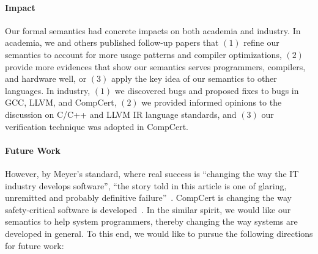 \paragraph{Impact}

Our formal semantics had concrete impacts on both academia and industry.  In academia, we and others
published follow-up papers that $(1)$ refine our semantics to account for more usage patterns and
compiler optimizations, $(2)$ provide more evidences that show our semantics serves programmers,
compilers, and hardware well, or $(3)$ apply the key idea of our semantics to other languages.  In
industry, $(1)$ we discovered bugs and proposed fixes to bugs in GCC, LLVM, and CompCert, $(2)$ we
provided informed opinions to the discussion on C/C++ and LLVM IR language standards, and $(3)$ our
verification technique was adopted in CompCert.



\paragraph{Future Work}

However, by Meyer's standard, where real success is ``changing the way the IT industry develops
software'', ``the story told in this article is one of glaring, unremitted and probably definitive
failure''~\cite{bertrand-meyer}.  CompCert is changing the way safety-critical software is
developed~\cite{compcert-avionics,compcert-nuclear}.  In the similar spirit, we would like our
semantics to help system programmers, thereby changing the way systems are developed in general.  To
this end, we would like to pursue the following directions for future work:

